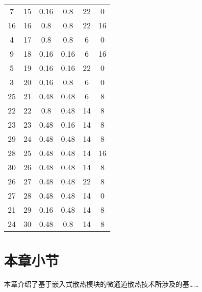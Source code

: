 \begin{longtable}{@{\extracolsep{\fill}}cccccc@{}}
    7   & 15  & 0.16            & 0.8            & 22       & 0        \\
    16  & 16  & 0.8             & 0.8            & 22       & 16       \\
    4   & 17  & 0.8             & 0.8            & 6        & 0        \\
    9   & 18  & 0.16            & 0.16           & 6        & 16       \\
    5   & 19  & 0.16            & 0.16           & 22       & 0        \\
    3   & 20  & 0.16            & 0.8            & 6        & 0        \\
    25  & 21  & 0.48            & 0.48           & 6        & 8        \\
    22  & 22  & 0.8             & 0.48           & 14       & 8        \\
    23  & 23  & 0.48            & 0.16           & 14       & 8        \\
    29  & 24  & 0.48            & 0.48           & 14       & 8        \\
    28  & 25  & 0.48            & 0.48           & 14       & 16       \\
    30  & 26  & 0.48            & 0.48           & 14       & 8        \\
    26  & 27  & 0.48            & 0.48           & 22       & 8        \\
    27  & 28  & 0.48            & 0.48           & 14       & 0        \\
    21  & 29  & 0.16            & 0.48           & 14       & 8        \\
    24  & 30  & 0.48            & 0.8            & 14       & 8        \\ \bottomrule
\end{longtable}

\section{本章小节}
本章介绍了基于嵌入式散热模块的微通道散热技术所涉及的基……
